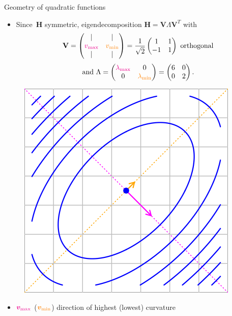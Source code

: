 \documentclass[11pt,compress,t,notes=noshow, xcolor=table]{beamer}
\begin{document}
\begin{vbframe}{Geometry of quadratic functions}
\begin{itemize}
    \item Since~$\mathbf{H}$ symmetric, eigendecomposition $\mathbf{H} = \mathbf{V}\Lambda\mathbf{V}^T$ with
        \begin{equation*}
            \mathbf{V} = \begin{pmatrix}
                    | & | \\
                    \textcolor{magenta}{v_\text{max}} & \textcolor{orange}{v_\text{min}} \\
                    | & |
                \end{pmatrix}
                = \frac{1}{\sqrt{2}} \begin{pmatrix}
                    1 & 1 \\
                    -1 & 1
                \end{pmatrix}
            \text{ orthogonal}
        \end{equation*}
        \begin{equation*}
            \text{and }
            \Lambda = \begin{pmatrix}
                \textcolor{magenta}{\lambda_\text{max}} & 0 \\
                0 & \textcolor{orange}{\lambda_\text{min}}
            \end{pmatrix}
            = \begin{pmatrix}6 & 0 \\ 0 & 2\end{pmatrix}.
        \end{equation*}
\end{itemize}

\vspace{-0.5\baselineskip}

\begin{figure}
    \includegraphics[height=0.28\textwidth,keepaspectratio]{figure_man/quadr-eigenv.png}
\end{figure}
  
\framebreak
    
\begin{itemize}
    \item $\textcolor{magenta}{\bm{v}_\text{max}}$ ($\textcolor{orange}{\bm{v}_\text{min}}$) direction of highest (lowest) curvature


\end{itemize}
\end{vbframe}
\end{document}
